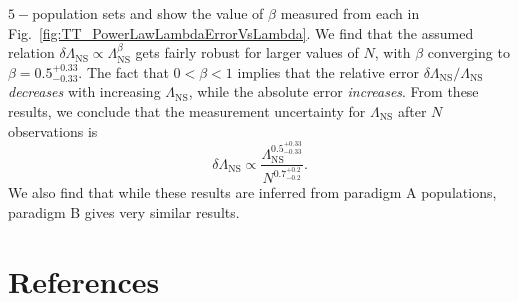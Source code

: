 \documentclass[aps,prd,amsmath,floats,floatfix, twocolumn,
superscriptaddress,nofootinbib,showpacs]{revtex4-1}
\newcommand{\lambdans}{\Lambda_\mathrm{NS}}
\begin{document}
\begin{appendix}
$5-$population sets and show the value of $\beta$ measured from each in 
Fig.~\ref{fig:TT_PowerLawLambdaErrorVsLambda}. We find that the assumed
relation $\delta\lambdans\propto\lambdans^\beta$ gets fairly robust for 
larger values of $N$, with $\beta$ converging to $\beta=0.5^{+0.33}_{-0.33}$.
The fact that $0<\beta<1$ implies that the relative error
$\delta\lambdans/\lambdans$ {\it decreases} with increasing $\lambdans$, while
the absolute error {\it increases}.
% 
From these results, we conclude that the measurement uncertainty for
$\lambdans$ after $N$ observations is
\begin{equation}
 \delta\lambdans\propto \dfrac{\lambdans^{0.5^{+0.33}_{-0.33}}}{N^{0.7_{-0.2}^{+0.2}}}.
\end{equation}
We also find that while these results are inferred from paradigm A populations,
paradigm B gives very similar results.


\end{appendix}




\section*{References}

\end{document}

